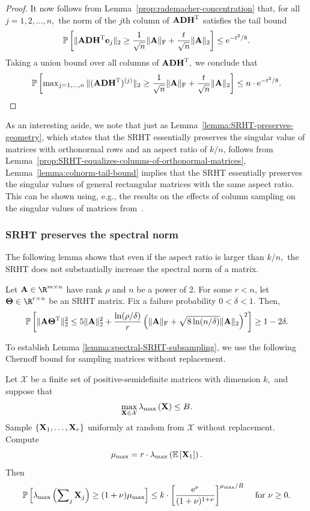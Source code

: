 \begin{proof}
It now follows from Lemma~\ref{prop:rademacher-concentration} that, for all $j=1,2,\ldots,n,$ the norm of the $j$th column of ${\bm{\mathrm{A}}} {\bm{\mathrm{D}}} {\bm{\mathrm{H}}} ^{\textsc{T}}$ satisfies the tail bound
\[
 \mbox{}{\mathbb{P}}\left[ \mbox{}\|{\bm{\mathrm{A}}} {\bm{\mathrm{D}}} {\bm{\mathrm{H}}} ^{\textsc{T}} {\mathbf e}_j\|_2 \geq {1\over \sqrt{n}} \mbox{}\|{\bm{\mathrm{A}}}\|_\mathrm{F} + {t\over \sqrt{n}} \mbox{}\|{\bm{\mathrm{A}}}\|_2 \right] \leq {\mathrm e}^{-t^2/8}.
\]
Taking a union bound over all columns of ${\bm{\mathrm{A}}}{\bm{\mathrm{D}}}{\bm{\mathrm{H}}} ^{\textsc{T}},$ we conclude that
\[
 \mbox{}{\mathbb{P}}\left[ \max\nolimits_{j=1,\ldots,n} \mbox{}\|({\bm{\mathrm{A}}} {\bm{\mathrm{D}}} {\bm{\mathrm{H}}} ^{\textsc{T}})^{(j)}\|_2 \geq {1\over \sqrt{n}} \mbox{}\|{\bm{\mathrm{A}}}\|_\mathrm{F} + {t\over \sqrt{n}} \mbox{}\|{\bm{\mathrm{A}}}\|_2 \right] \leq n \cdot {\mathrm e}^{-t^2/8}.
\]
\end{proof}

As an interesting aside, we note that just as Lemma~\ref{lemma:SRHT-preserves-geometry}, which states that the SRHT essentially preserves the singular value of matrices with orthonormal rows and an aspect ratio of $k/n$, follows from Lemma~\ref{prop:SRHT-equalizes-columns-of-orthonormal-matrices}, Lemma~\ref{lemma:colnorm-tail-bound} implies that the SRHT essentially preserves the singular values of general rectangular matrices with the same aspect ratio. This can be shown using, e.g., the results on the effects of column sampling on the singular values of matrices from~\cite[Section 6]{TailBounds}.

\subsubsection{SRHT preserves the spectral norm}
The following lemma shows that even if the aspect ratio is larger than $k/n,$ the SRHT does not substantially increase the spectral norm of a matrix.

\begin{lemma}
\label{lemma:spectral-SRHT-subsampling}
Let $\matA \in \R^{m \times n}$ have rank $\rho$ and $n$ be a power of 2. For some $r < n$, let $\matTh \in \R^{r \times n}$ be an SRHT matrix. Fix a failure probability $0 < \delta < 1.$ Then,
\[
\mbox{}{\mathbb{P}}\left[\mbox{}\|{\bm{\mathrm{A}}} {\bm{\mathrm{\Theta}}} ^{\textsc{T}}\|_2^2 \le 5 \mbox{}\|{\bm{\mathrm{A}}}\|_2^2
+ {\ln (\rho/\delta)\over r} \left( \mbox{}\|{\bm{\mathrm{A}}}\|_\mathrm{F} + \sqrt{8 \ln(n/\delta)} \mbox{}\|{\bm{\mathrm{A}}}\|_2 \right)^2 \right]
\geq 1-2\delta.
\]
\end{lemma}

To establish Lemma \ref{lemma:spectral-SRHT-subsampling}, we use the following Chernoff bound for sampling matrices without replacement.

\begin{lemma}
\label{prop:matrix-chernoff-bound}
 Let $\mathcal{X}$ be a finite set of positive-semidefinite matrices with dimension $k,$ and suppose that
\[
 \max_{{\bm{\mathrm{X}}} \in \mathcal{X}} \lambda_{\mathrm{max}}\left({\bm{\mathrm{X}}}\right) \leq B.
\]
Sample $\{{\bm{\mathrm{X}}}_1, \ldots, {\bm{\mathrm{X}}}_r\}$ uniformly at random from $\mathcal{X}$ without replacement. Compute
\[
 \mu_{\mathrm{max}} = r \cdot \lambda_{\mathrm{max}}\left(\mbox{}{\mathbb{E}}\left[{\bm{\mathrm{X}}}_1\right]\right).
\]
Then
\[
 \mbox{}{\mathbb{P}}\left[\lambda_{\mathrm{max}}\left(\sum\nolimits_j {\bm{\mathrm{X}}}_j\right) \geq (1+\nu)\mu_{\mathrm{max}} \right] \leq k \cdot \bigg[ {{\mathrm e}^\nu\over (1+\nu)^{1+ \nu}} \bigg]^{\mu_{\mathrm{max}}/B} \quad \text{ for $\nu \geq 0.$}
\]
\end{lemma}

